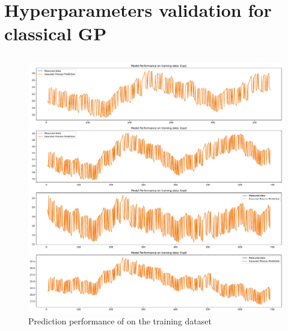 \clearpage

\section{Hyperparameters validation for classical GP}\label{apx:hyperparams_gp}

\subsection{\texorpdfstring{}{113}}

\begin{figure}[ht]
    \centering
    \includegraphics[width = \textwidth]{Plots/GP_113_training_performance.pdf}
    \caption{Prediction performance of  on the training dataset}
    \label{fig:GP_train_validation}
\end{figure}

